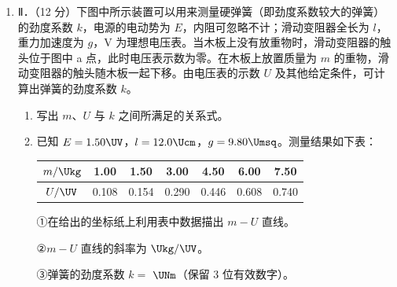 \documentclass[\gkver]{gaokaozhenti}
\begin{document}
\begin{enumerate}
\begin{enumerate}
	\item
Ⅱ．（12 分）下图中所示装置可以用来测量硬弹簧（即劲度系数较大的弹簧）的劲度系数 $k$，电源的电动势为 $E$，内阻可忽略不计；滑动变阻器全长为 $l$，重力加速度为 $g$，V 为理想电压表。当木板上没有放重物时，滑动变阻器的触头位于图中 a 点，此时电压表示数为零。在木板上放置质量为 $m$ 的重物，滑动变阻器的触头随木板一起下移。由电压表的示数 $U$ 及其他给定条件，可计算出弹簧的劲度系数 $k$。


\begin{enumerate}
	\item
	写出 $m$、$U$ 与 $k$ 之间所满足的关系式。

	\item
	已知 $E=1.50\UV$，$l=12.0\Ucm$，$g=9.80\Umsq$。测量结果如下表：

	\begin{center}
	\begin{tabular}{|c|c|c|c|c|c|c|}
	\hline
	$m/\Ukg$ & 1.00 & 1.50 & 3.00 & 4.50 & 6.00 & 7.50 \\ \hline
	$U/\UV$ & 0.108 & 0.154 & 0.290 & 0.446 & 0.608 & 0.740 \\ \hline
	\end{tabular}
	\end{center}

	①在给出的坐标纸上利用表中数据描出 $m-U$ 直线。


	②$m-U$ 直线的斜率为  $\Ukg/\UV$。

	③弹簧的劲度系数 $k=$  $\UNm$（保留 3 位有效数字）。
\end{enumerate}
\end{enumerate}


\end{enumerate}
\end{document}
